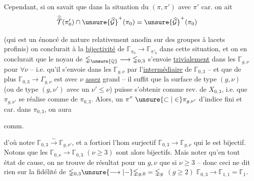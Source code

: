 Cependant, si on savait que dans la situation du $(\pi,\pi')$ avec $\pi'$  car. on ait
\[
\widehat{\widehat{\mathcal T}}(\pi'_0)\cap
\unsure{\widehat{\mathcal G}}^{+}(\pi_0)
=
\unsure{\widehat{\mathcal G}}^{+}(\pi_0)
\]

(qui est un énoncé de nature relativement anodin sur des groupes à lacets profinis) on conclurait à la \uline{bijectivité} de $\mathbb{\Gamma}_{\pi_0}\longrightarrow\mathbb{\Gamma}_{\pi'_0}$ dans cette situation, et on en conclurait que le noyau de $\mathbb{\Gamma}_{\unsure{\mathbb Q}}\longrightarrow\mathbb{\Gamma}_{0,3}$  s'envoie \uline{trivialement} dans les $\mathbb{\Gamma}_{g,\nu}$ pour $\forall\nu$ -- i.e. qu'il s'envoie dans les $\mathbb{\Gamma}_{g,\nu}$ par l'\uline{intermédiaire} de $\mathbb{\Gamma}_{0,3}$  -- et que de plus $\mathbb{\Gamma}_{0,3}\longrightarrow\Gamma_{g,\nu}$ est
 avec $\nu$ \uline{assez} grand -- il suffit que la surface de type $(g,\nu)$  (ou de type $(g,\nu')$ avec un $\nu'\leq\nu$) puisse s'obtenir comme rev.  de $X_{0,3}$, i.e. que $\pi_{g,\nu'}$ se réalise  comme     de $\pi_{0,3}$. Alors,   un $\pi''$  $\unsure{\subset|\in}\pi_{g,\nu'}$ d'indice fini et car. dans $\pi_{0,3}$, on aura

 comm.

d'où notre  $\mathbb{\Gamma}_{0,3}\xrightarrow{\sim}\mathbb{\Gamma}_{g,\nu'}$, et a fortiori l'hom surjectif $\mathbb{\Gamma}_{0,3}\longrightarrow\mathbb{\Gamma}_{g,\nu}$ qui le   est bijectif. Notons  que les $\mathbb{\Gamma}_{0,\nu}\longrightarrow\mathbb{\Gamma}_{0,3}$ $(\nu\geq3)$ sont alors bijectifs. Mais  noter qu'en tout état de cause, on ne trouve de résultat pour un $g,\nu$ que si $\nu\geq3$ -- donc ceci ne dit rien sur la fidélité   de $\mathbb{\Gamma}_{0,3}\unsure{\longrightarrow|-}\mathbb{\Gamma}_{g,0}=\mathbb{\Gamma}_g$ $(g\geq2)$  $\mathbb{\Gamma}_{0,3}\longrightarrow\mathbb{\Gamma}_{1,1}=\mathbb{\Gamma}_1$.


